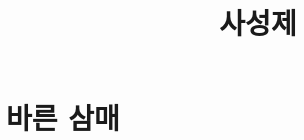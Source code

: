\documentclass[12pt, a3paper, landscape, oneside]{book}
\begin{document}
			\dominitoc
			\doparttoc			




			\title{사성제 }
			\maketitle


			\tableofcontents 		%
			\cleardoublepage
			\listoftables 			%



	\clearpage	
	\section{바른 삼매}
	\pagestyle{empty}
\end{document}
